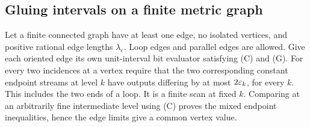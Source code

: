 \subsection{Gluing intervals on a finite metric graph}
Let a finite connected graph have at least one edge, no isolated vertices, and positive rational edge lengths $\lambda_e$. Loop edges and parallel edges are allowed. Give each oriented edge its own unit-interval bit evaluator satisfying (C) and (G). For every two incidences at a vertex require that the two corresponding constant endpoint streams at level $k$ have outputs differing by at most $2\varepsilon_k$, for every $k$. This includes the two ends of a loop. It is a finite scan at fixed $k$. Comparing at an arbitrarily fine intermediate level using (C) proves the mixed endpoint inequalities, hence the edge limits give a common vertex value.

